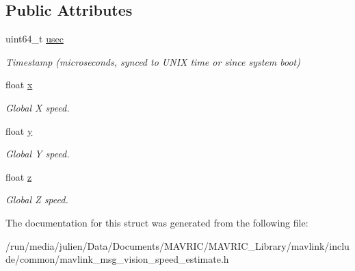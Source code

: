 \subsection*{Public Attributes}
\begin{DoxyCompactItemize}
\item 
\hypertarget{struct____mavlink__vision__speed__estimate__t_adfc952857e519d31dfaa6f3cdd153843}{uint64\+\_\+t \hyperlink{struct____mavlink__vision__speed__estimate__t_adfc952857e519d31dfaa6f3cdd153843}{usec}}\label{struct____mavlink__vision__speed__estimate__t_adfc952857e519d31dfaa6f3cdd153843}

\begin{DoxyCompactList}\small\item\em Timestamp (microseconds, synced to U\+N\+I\+X time or since system boot) \end{DoxyCompactList}\item 
\hypertarget{struct____mavlink__vision__speed__estimate__t_a8fcd91c8bacb70d5b1bd6df87fb01a5a}{float \hyperlink{struct____mavlink__vision__speed__estimate__t_a8fcd91c8bacb70d5b1bd6df87fb01a5a}{x}}\label{struct____mavlink__vision__speed__estimate__t_a8fcd91c8bacb70d5b1bd6df87fb01a5a}

\begin{DoxyCompactList}\small\item\em Global X speed. \end{DoxyCompactList}\item 
\hypertarget{struct____mavlink__vision__speed__estimate__t_ae2bcf3949b4e0ac7d21b4bc886fea08c}{float \hyperlink{struct____mavlink__vision__speed__estimate__t_ae2bcf3949b4e0ac7d21b4bc886fea08c}{y}}\label{struct____mavlink__vision__speed__estimate__t_ae2bcf3949b4e0ac7d21b4bc886fea08c}

\begin{DoxyCompactList}\small\item\em Global Y speed. \end{DoxyCompactList}\item 
\hypertarget{struct____mavlink__vision__speed__estimate__t_a019d0fa1a28f8c96b0092c9c47ced03d}{float \hyperlink{struct____mavlink__vision__speed__estimate__t_a019d0fa1a28f8c96b0092c9c47ced03d}{z}}\label{struct____mavlink__vision__speed__estimate__t_a019d0fa1a28f8c96b0092c9c47ced03d}

\begin{DoxyCompactList}\small\item\em Global Z speed. \end{DoxyCompactList}\end{DoxyCompactItemize}


The documentation for this struct was generated from the following file\+:\begin{DoxyCompactItemize}
\item 
/run/media/julien/\+Data/\+Documents/\+M\+A\+V\+R\+I\+C/\+M\+A\+V\+R\+I\+C\+\_\+\+Library/mavlink/include/common/mavlink\+\_\+msg\+\_\+vision\+\_\+speed\+\_\+estimate.\+h\end{DoxyCompactItemize}
